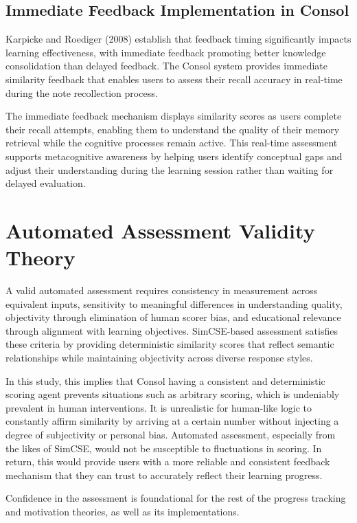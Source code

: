 {\color{maroon}
\subsection{Immediate Feedback Implementation in Consol}

Karpicke and Roediger (2008) establish that feedback timing significantly impacts learning effectiveness, with immediate feedback promoting better knowledge consolidation than delayed feedback. The Consol system provides immediate similarity feedback that enables users to assess their recall accuracy in real-time during the note recollection process.

The immediate feedback mechanism displays similarity scores as users complete their recall attempts, enabling them to understand the quality of their memory retrieval while the cognitive processes remain active. This real-time assessment supports metacognitive awareness by helping users identify conceptual gaps and adjust their understanding during the learning session rather than waiting for delayed evaluation.
}

{\color{maroon}
\section{Automated Assessment Validity Theory}


A valid automated assessment requires consistency in measurement across equivalent inputs, sensitivity to meaningful differences in understanding quality, objectivity through elimination of human scorer bias, and educational relevance through alignment with learning objectives. SimCSE-based assessment satisfies these criteria by providing deterministic similarity scores that reflect semantic relationships while maintaining objectivity across diverse response styles.

In this study, this implies that Consol having a consistent and deterministic scoring agent prevents situations such as arbitrary scoring, which is undeniably prevalent in human interventions. It is unrealistic for human-like logic to constantly affirm similarity by arriving at a certain number without injecting a degree of subjectivity or personal bias. Automated assessment, especially from the likes of SimCSE, would not be susceptible to fluctuations in scoring. In return, this would provide users with a more reliable and consistent feedback mechanism that they can trust to accurately reflect their learning progress.

Confidence in the assessment is foundational for the rest of the progress tracking and motivation theories, as well as its implementations. 
} 

